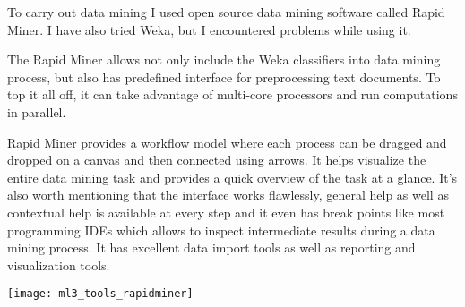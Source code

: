 
    To carry out data mining I used open source data mining software called Rapid Miner. I have also tried Weka, but I encountered problems while using it. 
    
    The Rapid Miner allows not only include the Weka classifiers into data mining process, but also has predefined interface for preprocessing text documents.
To top it all off, it can take advantage of multi-core processors and run computations in parallel.

Rapid Miner provides a workflow model where each process can be dragged and dropped on a canvas and then connected using arrows. It helps visualize the entire data mining task and provides a quick overview of the task at a glance. It's also worth mentioning that the interface works flawlessly, general help as well as contextual help is available at every step and it even has break points like most programming IDEs which allows to inspect intermediate results during a data mining process. It has excellent data import tools as well as reporting and visualization tools.

\texttt{[image: ml3\_tools\_rapidminer]}
